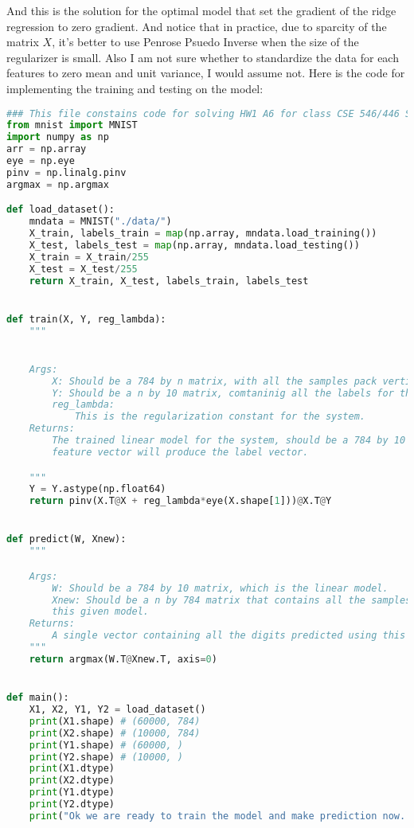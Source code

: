\documentclass[]{article}
\begin{document}
        And this is the solution for the optimal model that set the gradient of the ridge regression to zero gradient. And notice that in practice, due to sparcity of the matrix $X$, it's better to use Penrose Psuedo Inverse when the size of the regularizer is small. Also I am not sure whether to standardize the data for each features to zero mean and unit variance, I would assume not. Here is the code for implementing the training and testing on the model: 
        \begin{lstlisting}[language=python]
### This file constains code for solving HW1 A6 for class CSE 546/446 SPRING 2021.
from mnist import MNIST
import numpy as np
arr = np.array
eye = np.eye
pinv = np.linalg.pinv
argmax = np.argmax

def load_dataset():
    mndata = MNIST("./data/")
    X_train, labels_train = map(np.array, mndata.load_training())
    X_test, labels_test = map(np.array, mndata.load_testing())
    X_train = X_train/255
    X_test = X_test/255
    return X_train, X_test, labels_train, labels_test


def train(X, Y, reg_lambda):
    """


    Args:
        X: Should be a 784 by n matrix, with all the samples pack vertically as rows into the matrix.
        Y: Should be a n by 10 matrix, comtaninig all the labels for the digits pack vertically as rows for the matrix.
        reg_lambda:
            This is the regularization constant for the system.
    Returns:
        The trained linear model for the system, should be a 784 by 10 matrix such that its transpose multiply by the
        feature vector will produce the label vector.

    """
    Y = Y.astype(np.float64)
    return pinv(X.T@X + reg_lambda*eye(X.shape[1]))@X.T@Y


def predict(W, Xnew):
    """

    Args:
        W: Should be a 784 by 10 matrix, which is the linear model.
        Xnew: Should be a n by 784 matrix that contains all the samples we want to to predict with using
        this given model.
    Returns:
        A single vector containing all the digits predicted using this model.
    """
    return argmax(W.T@Xnew.T, axis=0)


def main():
    X1, X2, Y1, Y2 = load_dataset()
    print(X1.shape) # (60000, 784)
    print(X2.shape) # (10000, 784)
    print(Y1.shape) # (60000, )
    print(Y2.shape) # (10000, )
    print(X1.dtype)
    print(X2.dtype)
    print(Y1.dtype)
    print(Y2.dtype)
    print("Ok we are ready to train the model and make prediction now. ")


\end{lstlisting}
\end{document}
